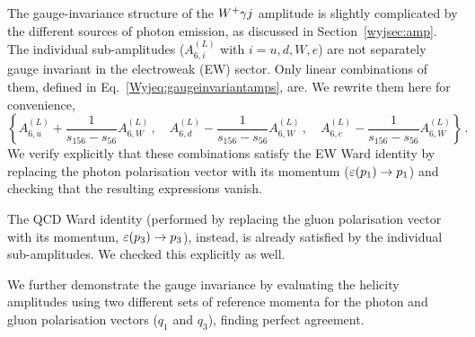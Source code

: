 \documentclass[main.tex]{subfiles}
\begin{document}
The gauge-invariance structure of the $W^+\gamma j$ amplitude is slightly complicated by the different sources of photon emission, as discussed in Section~\ref{wyjsec:amp}.
The individual sub-amplitudes ($A^{(L)}_{6,i}$ with $i=u,d,W,e$) are not separately gauge invariant in the electroweak (EW) sector. Only linear combinations of them, defined in 
Eq.~\eqref{Wyjeq:gaugeinvariantamps}, are. We rewrite them here for convenience,
\begin{equation} \label{Wyjeq:gaugeinvcombinations}
\left\{ A^{(L)}_{6,u} + \frac{1}{s_{156}-s_{56}} A^{(L)}_{6,W} \,, \quad 
 A^{(L)}_{6,d} - \frac{1}{s_{156}-s_{56}} A^{(L)}_{6,W} \,, \quad 
 A^{(L)}_{6,e} - \frac{1}{s_{156}-s_{56}} A^{(L)}_{6,W} \right\} \,.
\end{equation}
We verify explicitly that these combinations satisfy the EW Ward identity by replacing the photon polarisation vector with its momentum ($\varepsilon(p_1) \to p_1$) and checking that the resulting expressions vanish.

The QCD Ward identity (performed by replacing the gluon polarisation vector with its momentum, $\varepsilon(p_3) \to p_3$), instead, is already satisfied by the individual sub-amplitudes. We checked this explicitly as well.

We further demonstrate the gauge invariance by evaluating the helicity amplitudes using two different sets of reference momenta for the photon and gluon polarisation vectors ($q_1$ and $q_3$), finding perfect agreement.
\end{document}
